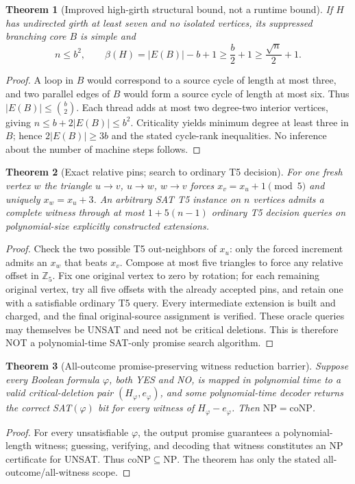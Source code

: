 \documentclass[11pt]{article}
\newtheorem{theorem}{Theorem}
\begin{document}
\begin{theorem}[Improved high-girth structural bound, not a runtime bound]
If $H$ has undirected girth at least seven and no isolated
vertices, its suppressed branching core $B$ is simple and
\[
n\le b^2,\qquad
\beta(H)=|E(B)|-b+1\ge \frac b2+1
\ge\frac{\sqrt n}{2}+1.
\]
\end{theorem}
\begin{proof}
A loop in $B$ would correspond to a source cycle of length at
most three, and two parallel edges of $B$ would form a source
cycle of length at most six. Thus
$|E(B)|\le\binom b2$. Each thread adds at most two degree-two
interior vertices, giving $n\le b+2|E(B)|\le b^2$.
Criticality yields minimum degree at least three in $B$;
hence $2|E(B)|\ge3b$ and the stated cycle-rank inequalities.
No inference about the number of machine steps follows.
\end{proof}

\begin{theorem}[Exact relative pins; search to ordinary T5 decision]
For one fresh vertex $w$ the triangle
$u\to v$, $u\to w$, $w\to v$ forces
$x_v=x_u+1\pmod5$ and uniquely $x_w=x_u+3$.
An arbitrary SAT T5 instance on $n$ vertices admits a complete
witness through at most $1+5(n-1)$ ordinary T5 decision queries
on polynomial-size explicitly constructed extensions.
\end{theorem}
\begin{proof}
Check the two possible T5 out-neighbors of $x_u$:
only the forced increment admits an $x_w$ that beats $x_v$.
Compose at most five triangles to force any relative offset
in $\mathbb Z_5$. Fix one original vertex to zero by rotation;
for each remaining original vertex, try all five offsets with
the already accepted pins, and retain one with a satisfiable
ordinary T5 query. Every intermediate extension is built
and charged, and the final original-source assignment is verified.
These oracle queries may themselves be UNSAT and need not be
critical deletions. This is therefore NOT a polynomial-time
SAT-only promise search algorithm.
\end{proof}

\begin{theorem}[All-outcome promise-preserving witness reduction barrier]
Suppose every Boolean formula $\varphi$, both YES and NO,
is mapped in polynomial time to a valid critical-deletion pair
$(H_\varphi,e_\varphi)$, and some polynomial-time decoder returns
the correct SAT$(\varphi)$ bit for \emph{every} witness of
$H_\varphi-e_\varphi$. Then $\mathrm{NP}=\mathrm{coNP}$.
\end{theorem}
\begin{proof}
For every unsatisfiable $\varphi$, the output promise guarantees
a polynomial-length witness; guessing, verifying, and decoding
that witness constitutes an NP certificate for UNSAT.
Thus $\mathrm{coNP}\subseteq\mathrm{NP}$.
The theorem has only the stated all-outcome/all-witness scope.
\end{proof}
\end{document}
